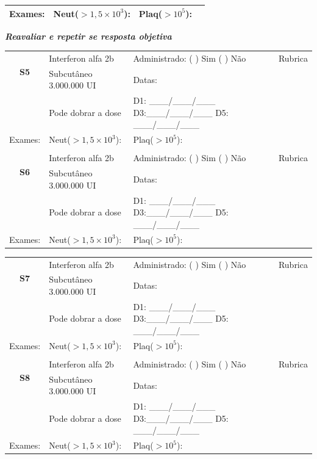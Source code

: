 \documentclass[11pt,a4paper,oldfontcommands]{memoir}
\begin{document}
\begin{center}
\begin{table}[H]
\begin{tabular}{p{1.3cm}p{4.2cm}|p{8cm}|p{}}
    \hline
    {Exames:}&{Neut(\(>1,5\times10^3\)):}&{Plaq(\(>10^5\)):}&{}
    \\
    \hline
\end{tabular}
\end{table}
\textbf{\textit{Reavaliar e repetir se resposta objetiva}}
\begin{table}[H]
\begin{tabular}{p{1.3cm}p{4.2cm}|p{8cm}|p{}}
    \hline
    \multicolumn{1}{c|}{\multirow{2}{*}{\textbf{S5}}}&{Interferon alfa 2b}&{Administrado: (  ) Sim (  ) Não}&{Rubrica}\\
    \multicolumn{1}{c|}{}&{Subcutâneo 3.000.000 UI}&{Datas:}&\\
    \multicolumn{1}{c|}{}&{Pode dobrar a dose}&{D1: \_\_\_/\_\_\_/\_\_\_ D3:\_\_\_/\_\_\_/\_\_\_ D5: \_\_\_/\_\_\_/\_\_\_}&\\
    \hline
    {Exames:}&{Neut(\(>1,5\times10^3\)):}&{Plaq(\(>10^5\)):}&{}
    \\
    \hline
    \\
    \hline
    \multicolumn{1}{c|}{\multirow{2}{*}{\textbf{S6}}}&{Interferon alfa 2b}&{Administrado: (  ) Sim (  ) Não}&{Rubrica}\\
    \multicolumn{1}{c|}{}&{Subcutâneo 3.000.000 UI}&{Datas:}&\\
    \multicolumn{1}{c|}{}&{Pode dobrar a dose}&{D1: \_\_\_/\_\_\_/\_\_\_ D3:\_\_\_/\_\_\_/\_\_\_ D5: \_\_\_/\_\_\_/\_\_\_}&\\
    \hline
    {Exames:}&{Neut(\(>1,5\times10^3\)):}&{Plaq(\(>10^5\)):}&{}
    \\
    \hline
\end{tabular}
\end{table}
\begin{table}[H]
\begin{tabular}{p{1.3cm}p{4.2cm}|p{8cm}|p{}}
    \hline
    \multicolumn{1}{c|}{\multirow{2}{*}{\textbf{S7}}}&{Interferon alfa 2b}&{Administrado: (  ) Sim (  ) Não}&{Rubrica}\\
    \multicolumn{1}{c|}{}&{Subcutâneo 3.000.000 UI}&{Datas:}&\\
    \multicolumn{1}{c|}{}&{Pode dobrar a dose}&{D1: \_\_\_/\_\_\_/\_\_\_ D3:\_\_\_/\_\_\_/\_\_\_ D5: \_\_\_/\_\_\_/\_\_\_}&\\
    \hline
    {Exames:}&{Neut(\(>1,5\times10^3\)):}&{Plaq(\(>10^5\)):}&{}
    \\
    \hline
    \\
    \hline
    \multicolumn{1}{c|}{\multirow{2}{*}{\textbf{S8}}}&{Interferon alfa 2b}&{Administrado: (  ) Sim (  ) Não}&{Rubrica}\\
    \multicolumn{1}{c|}{}&{Subcutâneo 3.000.000 UI}&{Datas:}&\\
    \multicolumn{1}{c|}{}&{Pode dobrar a dose}&{D1: \_\_\_/\_\_\_/\_\_\_ D3:\_\_\_/\_\_\_/\_\_\_ D5: \_\_\_/\_\_\_/\_\_\_}&\\
    \hline
    {Exames:}&{Neut(\(>1,5\times10^3\)):}&{Plaq(\(>10^5\)):}&{}
    \\
    \hline
\end{tabular}
\end{table}
\end{center}
\end{document}
